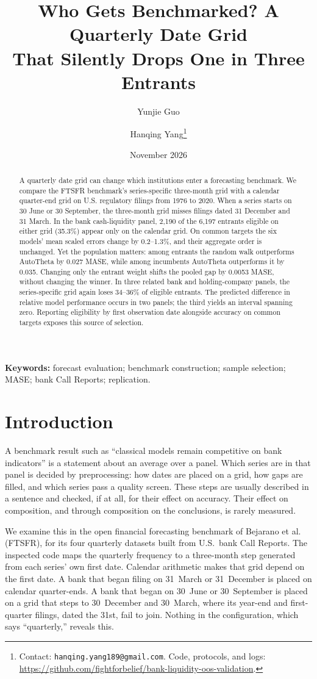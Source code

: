 \documentclass[11pt]{article}
\title{Who Gets Benchmarked? A Quarterly Date Grid\\ That Silently Drops One in Three Entrants}
\author{Yunjie Guo \and Hanqing Yang\thanks{Contact: \texttt{hanqing.yang189@gmail.com}. Code, protocols, and logs: \url{https://github.com/fightforbelief/bank-liquidity-oos-validation}.}}
\date{November 2026}
\begin{document}
\maketitle

\begin{abstract}
A quarterly date grid can change which institutions enter a forecasting benchmark. We compare the FTSFR benchmark's series-specific three-month grid with a calendar quarter-end grid on U.S. regulatory filings from 1976 to 2020. When a series starts on 30 June or 30 September, the three-month grid misses filings dated 31 December and 31 March. In the bank cash-liquidity panel, 2,190 of the 6,197 entrants eligible on either grid (35.3\%) appear only on the calendar grid. On common targets the six models' mean scaled errors change by 0.2--1.3\%, and their aggregate order is unchanged. Yet the population matters: among entrants the random walk outperforms AutoTheta by 0.027 MASE, while among incumbents AutoTheta outperforms it by 0.035. Changing only the entrant weight shifts the pooled gap by 0.0053 MASE, without changing the winner. In three related bank and holding-company panels, the series-specific grid again loses 34--36\% of eligible entrants. The predicted difference in relative model performance occurs in two panels; the third yields an interval spanning zero. Reporting eligibility by first observation date alongside accuracy on common targets exposes this source of selection.
\end{abstract}

\noindent\textbf{Keywords:} forecast evaluation; benchmark construction; sample selection; MASE; bank Call Reports; replication.

\section{Introduction}
A benchmark result such as ``classical models remain competitive on bank indicators'' is a statement about an average over a panel. Which series are in that panel is decided by preprocessing: how dates are placed on a grid, how gaps are filled, and which series pass a quality screen. These steps are usually described in a sentence and checked, if at all, for their effect on accuracy. Their effect on composition, and through composition on the conclusions, is rarely measured.

We examine this in the open financial forecasting benchmark of Bejarano et al.~\cite{bejarano2026} (FTSFR), for its four quarterly datasets built from U.S.\ bank Call Reports. The inspected code maps the quarterly frequency to a three-month step generated from each series' own first date. Calendar arithmetic makes that grid depend on the first date. A bank that began filing on 31~March or 31~December is placed on calendar quarter-ends. A bank that began on 30~June or 30~September is placed on a grid that steps to 30~December and 30~March, where its year-end and first-quarter filings, dated the 31st, fail to join. Nothing in the configuration, which says ``quarterly,'' reveals this.
\end{document}
